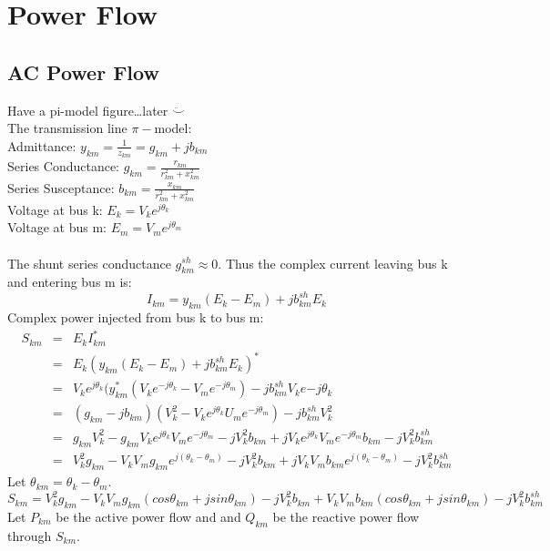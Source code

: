 \chapter{Power Flow}
\section{AC Power Flow}
Have a pi-model figure\ldots later $\ddot\smile$\\
The transmission line $\pi-$model: \\
Admittance: $y_{km} = \frac{1}{z_{km}} = g_{km} + jb_{km}$ \\
Series Conductance: $g_{km}=\frac{r_{km}}{r^2_{km}+x^2_{km}}$ \\
Series Susceptance: $b_{km}=\frac{x_{km}}{r^2_{km}+x^2_{km}}$ \\
Voltage at bus k: $E_k = V_ke^{j\theta_k}$ \\
Voltage at bus m: $E_m = V_me^{j\theta_m}$ \\
\\
The shunt series conductance $g^{sh}_{km} \approx 0$. Thus the complex current leaving bus k and entering bus m is: 
\begin{equation} I_{km}=y_{km}(E_k-E_m) + jb^{sh}_{km}E_k \end{equation}
Complex power injected from bus k to bus m:
\begin{eqnarray}
S_{km} &=& E_kI^{*}_{km} \\
      &=& E_k(y_{km}(E_k-E_m)+jb^{sh}_{km}E_k)^* \nonumber \\
      &=& V_ke^{j\theta_k}(y^*_{km}(V_ke^{-j\theta_k}-V_me^{-j\theta_m})-jb^{sh}_{km}V_ke{-j\theta_k} \nonumber \\
      &=& (g_{km}-jb_{km})(V_k^2-V_ke^{j\theta_k}U_me^{-j\theta_m})-jb^{sh}_{km}V^2_k \nonumber \\
      &=& g_{km}V^2_k-g_{km}V_ke^{j\theta_k}V_me^{-j\theta_m}-jV^2_kb_{km}+jV_ke^{j\theta_k}V_me^{-j\theta_m}b_{km}-jV^2_kb^{sh}_{km} \nonumber \\
      &=& V^2_kg_{km}-V_kV_mg_{km}e^{j(\theta_k - \theta_m)}-jV^2_kb_{km}+jV_kV_mb_{km}e^{j(\theta_k-\theta_m)}-jV^2_kb^{sh}_{km} \nonumber 
\end{eqnarray}
Let $\theta_{km}=\theta_k-\theta_m$.
\begin{equation}
S_{km} = V^2_kg_{km}-V_kV_mg_{km}(cos\theta_{km}+jsin\theta_{km})-jV^2_kb_{km}+V_kV_mb_{km}(cos\theta_{km}+jsin\theta_{km})- jV^2_kb^{sh}_{km} \nonumber 
\end{equation}
Let $P_{km}$ be the active power flow and and $Q_{km}$ be the reactive power flow through $S_{km}$.
